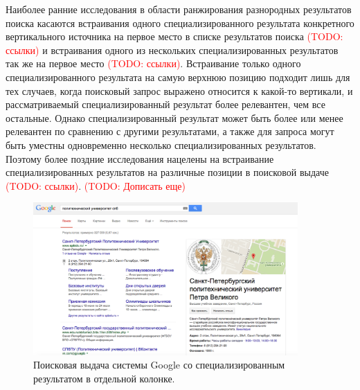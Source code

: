\documentclass[12pt,a4paper]{report}
\newcommand\note[1]{\textcolor{red}{(#1)}}
\newcommand\todonote[1]{\note{TODO: #1}}
\begin{document}
Наиболее ранние исследования в области ранжирования разнородных результатов поиска касаются встраивания одного специализированного результата конкретного вертикального источника на первое место в списке результатов поиска \todonote{ссылки} и встраивания одного из нескольких специализированных результатов так же на первое место \todonote{ссылки}. Встраивание только одного специализированного результата на самую верхнюю позицию подходит лишь для тех случаев, когда поисковый запрос выражено относится к какой-то вертикали, и рассматриваемый специализированный результат более релевантен, чем все остальные. Однако специализированный результат может быть более или менее релевантен по сравнению с другими результатами, а также для запроса могут быть уместны одновременно несколько специализированных результатов. Поэтому более поздние исследования нацелены на встраивание специализированных результатов на различные позиции в поисковой выдаче \todonote{ссылки}. \todonote{Дописать еще}


\begin{figure}[b!]
  \centering
  \includegraphics[width=0.9\textwidth]{pics/EntitySearch-Google.png}
  \caption{Поисковая выдача системы Google со специализированным результатом в отдельной колонке.}
  \label{two-coloumn-serp}
\end{figure}
\end{document}
